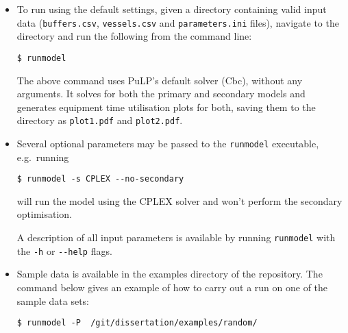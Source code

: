 \begin{itemize}
\item
To run using the default settings, given a directory containing valid input data
 (\texttt{buffers.csv},
\texttt{vessels.csv} and \texttt{parameters.ini} files), navigate to the
directory and run the following from the command line:

\texttt{\$ runmodel}

The above command uses PuLP's default solver (Cbc), without any arguments.
It solves for both the primary and secondary models and generates equipment
time utilisation plots for both, saving them to the directory as
\texttt{plot1.pdf} and \texttt{plot2.pdf}.

\item
Several optional parameters may be passed to the \texttt{runmodel} executable,
e.g.\ running

\texttt{\$ runmodel -s CPLEX -{}-no-secondary}

will run the model using the CPLEX solver and won't perform the secondary
optimisation.

A description of all input parameters is available by running \texttt{runmodel}
with the \texttt{-h} or \texttt{-{}-help} flags.

\item
Sample data is available in the examples directory of the repository.
The command below gives an example of how to carry out a run on one of the 
sample data sets:

\texttt{\$ runmodel -P ~/git/dissertation/examples/random/}
\end{itemize}
